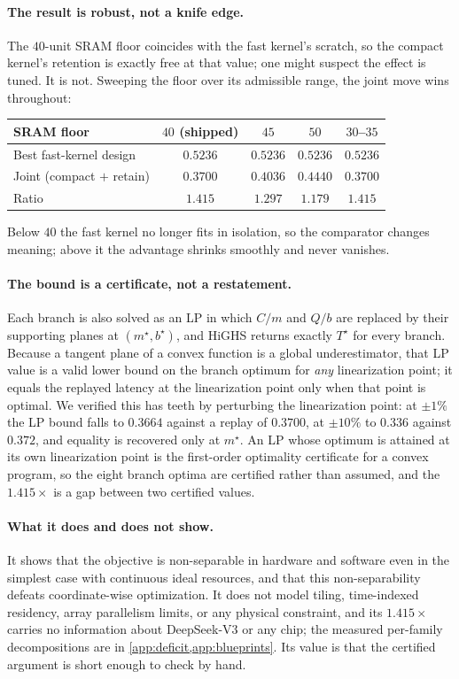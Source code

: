 \paragraph{The result is robust, not a knife edge.}
The $40$-unit SRAM floor coincides with the fast kernel's scratch, so the
compact kernel's retention is exactly free at that value; one might suspect the
effect is tuned. It is not. Sweeping the floor over its admissible range, the
joint move wins throughout:
%
\begin{center}
\small
\begin{tabular}{@{}lcccc@{}}
\toprule
SRAM floor & $40$ (shipped) & $45$ & $50$ & $30$--$35$ \\
\midrule
Best fast-kernel design & $0.5236$ & $0.5236$ & $0.5236$ & $0.5236$ \\
Joint (compact $+$ retain) & $0.3700$ & $0.4036$ & $0.4440$ & $0.3700$ \\
Ratio & $1.415$ & $1.297$ & $1.179$ & $1.415$ \\
\bottomrule
\end{tabular}
\end{center}
%
Below $40$ the fast kernel no longer fits in isolation, so the comparator
changes meaning; above it the advantage shrinks smoothly and never vanishes.

\paragraph{The bound is a certificate, not a restatement.}
Each branch is also solved as an LP in which $C/m$ and $Q/b$ are replaced by
their supporting planes at $(m^\star,b^\star)$, and HiGHS returns exactly
$T^\star$ for every branch. Because a tangent plane of a convex function is a
global underestimator, that LP value is a valid lower bound on the branch
optimum for \emph{any} linearization point; it equals the replayed latency at
the linearization point only when that point is optimal. We verified this has
teeth by perturbing the linearization point: at $\pm1\%$ the LP bound falls to
$0.3664$ against a replay of $0.3700$, at $\pm10\%$ to $0.336$ against $0.372$,
and equality is recovered only at $m^\star$. An LP whose optimum is attained at
its own linearization point is the first-order optimality certificate for a
convex program, so the eight branch optima are certified rather than assumed,
and the $1.415\times$ is a gap between two certified values.

\paragraph{What it does and does not show.}
It shows that the objective is non-separable in hardware and software even in
the simplest case with continuous ideal resources, and that this
non-separability defeats coordinate-wise optimization. It does not model
tiling, time-indexed residency, array parallelism limits, or any physical
constraint, and its $1.415\times$ carries no information about DeepSeek-V3 or
any chip; the measured per-family decompositions are in
\cref{app:deficit,app:blueprints}. Its value is that the certified argument is
short enough to check by hand.
